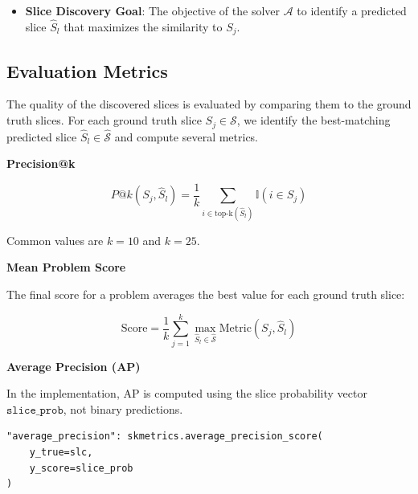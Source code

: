 \begin{itemize}
\begin{itemize}
        \item \textit{Example 3 (Label Noise Slices)}: ImageNet (\texttt{p\_122446}), Target: \texttt{cat.n.01}.
        \begin{itemize}
            \item \textbf{Overall Accuracy}: 83.36\%
            \item \textbf{Slice $S_0$}: \texttt{cougar.n.01} (Cougars often confused with house cats).
            \item \textbf{Slice $S_0$ Size}: 4.38\% (263 / 6004)
            \item \textbf{Slice $S_0$ Accuracy}: 57.03\%
        \end{itemize}
    \end{itemize}
    \item \textbf{Slice Discovery Goal}: The objective of the solver $\mathcal{A}$ to identify a predicted slice $\hat{S}_l$ that maximizes the similarity to $S_j$.
\end{itemize}


\subsection{Evaluation Metrics}

The quality of the discovered slices is evaluated by comparing them to the ground truth slices. 
For each ground truth slice $S_j \in \mathcal{S}$, we identify the best-matching predicted slice 
$\hat{S}_l \in \hat{\mathcal{S}}$ and compute several metrics.

\noindent\textbf{Precision@k}

\[
P@k(S_j, \hat{S}_l) 
= \frac{1}{k} 
\sum_{i \in \text{top-k}(\hat{S}_l)} \mathbb{I}(i \in S_j)
\]

Common values are $k = 10$ and $k = 25$.

\noindent\textbf{Mean Problem Score}

The final score for a problem averages the best value for each ground truth slice:

\[
\text{Score} = \frac{1}{k} 
\sum_{j=1}^{k} 
\max_{\hat{S}_l \in \hat{\mathcal{S}}}
\text{Metric}(S_j, \hat{S}_l)
\]

\noindent\textbf{Average Precision (AP)}

In the implementation, AP is computed using the slice probability vector 
$\texttt{slice\_prob}$, not binary predictions.

\begin{verbatim}
"average_precision": skmetrics.average_precision_score(
    y_true=slc,
    y_score=slice_prob
)
\end{verbatim}

